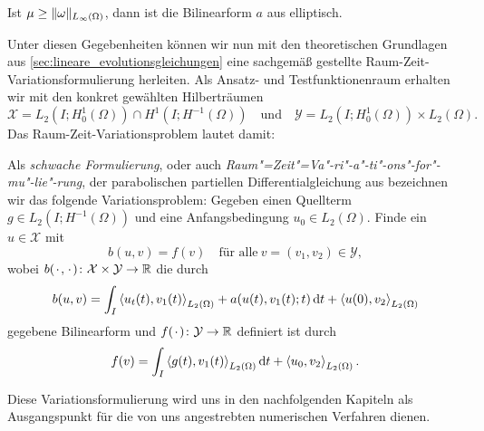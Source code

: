 \begin{Korollar}
\label{korollar:cha3:bf_elliptisch}
    Ist $\mu \geq \lVert\omega\rVert_{L_{\infty}(\Omega)}$, dann ist die Bilinearform $a$ aus  elliptisch.
\end{Korollar}

Unter diesen Gegebenheiten können wir nun mit den theoretischen Grundlagen aus \autoref{sec:lineare_evolutionsgleichungen} eine sachgemäß gestellte Raum-Zeit-Variationsformulierung herleiten.
Als Ansatz- und Testfunktionenraum erhalten wir mit den konkret gewählten Hilberträumen
\begin{equation}
    \label{eq:var_ansatzraum_testraum}
    \mathcal X = L_{2}(I; H^{1}_{0}(\Omega)) \cap H^{1}(I; H^{-1}(\Omega))
    \quad \text{und} \quad
    \mathcal Y = L_{2}(I; H^{1}_{0}(\Omega)) \times L_{2}(\Omega).
\end{equation}
Das Raum-Zeit-Variationsproblem lautet damit:
\begin{Definition}
\label{definition:cha3:schwache_formulierung}
    Als \emph{schwache Formulierung}, oder auch \emph{Raum"=Zeit"=Va"-ri"-a"-ti"-ons"-for"-mu"-lie"-rung}, der parabolischen partiellen Differentialgleichung aus  bezeichnen wir das folgende Variationsproblem:
    Gegeben einen Quellterm $g \in L_{2}(I; H^{-1}(\Omega))$ und eine Anfangsbedingung $u_{0} \in L_{2}(\Omega)$.
    Finde ein $u \in \mathcal X$ mit
    \begin{equation}
        \label{eq:varprob}
        b(u, v) = f(v) \quad \text{für alle}~v = (v_{1}, v_{2}) \in \mathcal Y,
    \end{equation}
    wobei $b({\mkern2mu\cdot\mkern2mu}, {\mkern2mu\cdot\mkern2mu}) \colon \mathcal X \times \mathcal Y \to \mathbb{R}$ die durch
    \begin{equation}
        \label{eq:buv}
        b(u, v)
            = \int_{I} \left\langle u_{t}(t),v_{1}(t)\right\rangle_{L_{2}(\Omega)} + a(u(t), v_{1}(t); t) \mathop{}\!\mathrm{d} t + \left\langle u(0),v_{2}\right\rangle_{L_{2}(\Omega)}
    \end{equation}
    gegebene Bilinearform und $f({\mkern2mu\cdot\mkern2mu}) \colon \mathcal Y \to \mathbb{R}$ definiert ist durch
    \begin{equation}
        \label{eq:var_all_f_wiederholung}
        f(v) = \int_{I} \left\langle g(t),v_{1}(t)\right\rangle_{L_{2}(\Omega)} \mathop{}\!\mathrm{d} t + \left\langle u_{0},v_{2}\right\rangle_{L_{2}(\Omega)}.
    \end{equation}
\end{Definition}

Diese Variationsformulierung wird uns in den nachfolgenden Kapiteln als Ausgangspunkt für die von uns angestrebten numerischen Verfahren dienen.

